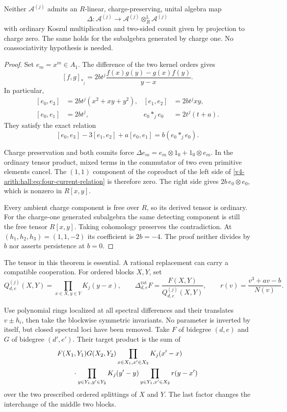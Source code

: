 \begin{theorem}\label{v4-arith:hall:thm:no-ordinary-coproduct}
Neither $\mathcal A^{(j)}$ admits an $R$-linear, charge-preserving,
unital algebra map
\[
 \Delta:\mathcal A^{(j)}\longrightarrow
          \mathcal A^{(j)}\otimes_R^{\mathbb L}\mathcal A^{(j)}
\]
with ordinary Koszul multiplication and two-sided counit given
by projection to charge zero. The same holds for the subalgebra
generated by charge one. No coassociativity hypothesis is needed.
\end{theorem}
\begin{proof}
Set $e_m=x^m\in A_1$. The difference of the two kernel orders gives
\[
 [f,g]_{*_j}=2bt^j\frac{f(x)g(y)-g(x)f(y)}{y-x}.
\]
In particular,
\[
 \begin{aligned}
 [e_0,e_3]&=2bt^j(x^2+xy+y^2),&
 [e_1,e_2]&=2bt^jxy,\\
 [e_0,e_1]&=2bt^j,&e_0*_je_0&=2t^j(t+a).
 \end{aligned}
\]
They satisfy the exact relation
\begin{equation}\label{v4-arith:hall:eq:four-current-relation}
 [e_0,e_3]-3[e_1,e_2]+a[e_0,e_1]=b(e_0*_je_0).
\end{equation}

Charge preservation and both counits force
$\Delta e_m=e_m\otimes1_0+1_0\otimes e_m$.
In the ordinary tensor product, mixed terms in the commutator
of two even primitive elements cancel. The $(1,1)$ component of
the coproduct of the left side of
\eqref{v4-arith:hall:eq:four-current-relation} is therefore zero.
The right side gives $2b\,e_0\otimes e_0$, which is nonzero
in $R[x,y]$.

Every ambient charge component is free over $R$, so its derived
tensor is ordinary. For the charge-one generated subalgebra the
same detecting component is still the free tensor $R[x,y]$.
Taking cohomology preserves the contradiction. At
$(h_1,h_2,h_3)=(1,1,-2)$ its coefficient is $2b=-4$.
The proof neither divides by $b$ nor asserts persistence at $b=0$.
\end{proof}

The tensor in this theorem is essential. A rational replacement
can carry a compatible cooperation. For ordered blocks $X,Y$, set
\[
 Q_{d,e}^{(j)}(X,Y)=\prod_{x\in X,y\in Y}K_j(y-x),\qquad
 \Delta_{d,e}^{\mathrm{rat}}F=
                \frac{F(X,Y)}{Q_{d,e}^{(j)}(X,Y)},\qquad
 r(v)=\frac{v^3+av-b}{N(v)}.
\]

Use polynomial rings localized at all spectral differences and
their translates $v\pm h_i$, then take the blockwise symmetric
invariants. No parameter is inverted by itself, but closed spectral
loci have been removed.
Take $F$ of bidegree $(d,e)$ and $G$ of bidegree $(d',e')$.
Their target product is the sum of
\[
 \begin{split}
 &F(X_1,Y_1)G(X_2,Y_2)
   \prod_{x\in X_1,x'\in X_2}K_j(x'-x)\\
 &\hspace{8mm}\cdot\prod_{y\in Y_1,y'\in Y_2}K_j(y'-y)
   \prod_{y\in Y_1,x'\in X_2}r(y-x')
 \end{split}
\]
over the two prescribed ordered splittings of $X$ and $Y$.
The last factor changes the interchange of the middle two blocks.

